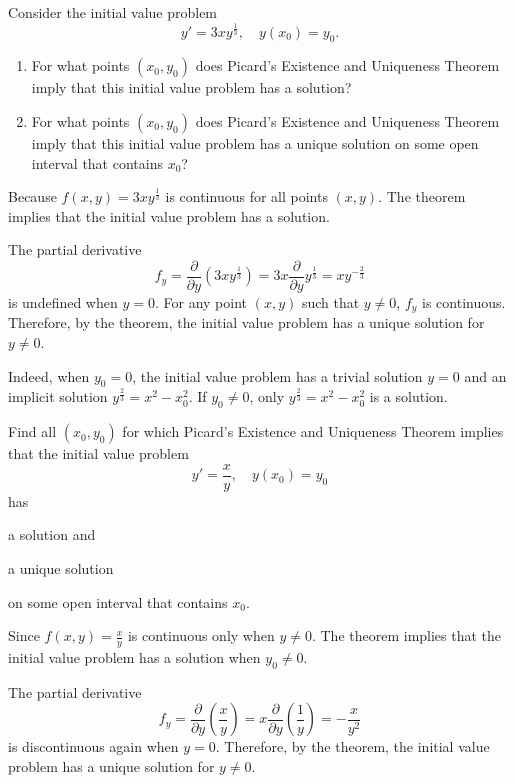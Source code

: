 \begin{example}
  Consider the initial value problem
\[y' = 3xy^{\frac13}, \quad y(x_0) = y_0.\]
\begin{enumerate}
  \item 
  For what points $(x_0,y_0)$ does Picard's Existence and Uniqueness Theorem imply that this initial value problem has a solution?
  \item For what points $(x_0,y_0)$ does Picard's Existence and Uniqueness Theorem imply that this initial value problem has a unique solution on some open interval that contains $x_0$?
\end{enumerate}
\end{example}
\begin{solution}
  Because $f(x, y)=3xy^{\frac13}$ is continuous for all points $(x, y)$. The theorem implies that the initial value problem has a solution.

  The partial derivative 
  \[f_y=\frac{\partial}{\partial y}\left(3xy^{\frac13}\right)=3x\frac{\partial}{\partial y}y^{\frac13}=xy^{-\frac23}\]
  is undefined when $y=0$. For any point $(x, y)$ such that $y\ne 0$, $f_y$ is continuous. Therefore, by the theorem, the initial value problem has a unique solution for $y\ne 0$.

  Indeed, when $y_0=0$, the initial value problem has a trivial solution $y=0$ and an implicit solution $y^{\frac23}=x^2-x_0^2$. If $y_0\ne 0$, only $y^{\frac23}=x^2-x_0^2$ is a solution.
\end{solution}

\begin{exercise}
  Find all $(x_0,y_0)$ for which Picard's Existence and Uniqueness Theorem implies that the initial value problem 
  \[y'=\frac xy,\quad y(x_0)=y_0\] 
  has 
  \begin{enumerate*}
    \item 
    a solution and
    \item a unique solution
  \end{enumerate*}
  on some open interval that contains $x_0$.
\end{exercise}

\begin{exersol}
  Since $f(x, y)=\frac xy$ is continuous only when $y\ne 0$. The theorem implies that the initial value problem has a solution when $y_0\ne 0$.

  The partial derivative 
  \[f_y=\frac{\partial}{\partial y}\left(\frac xy\right)=x\frac{\partial}{\partial y}\left(\frac1y\right)=-\frac{x}{y^2}\]
  is discontinuous again when $y=0$. Therefore, by the theorem, the initial value problem has a unique solution for $y\ne 0$.
\end{exersol}


